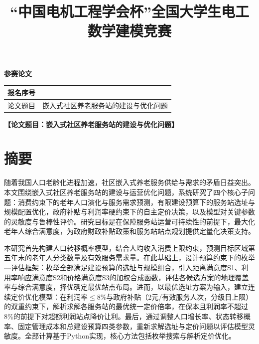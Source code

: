 \documentclass[UTF8]{ctexart}
\title{“中国电机工程学会杯”全国大学生电工数学建模竞赛}
\begin{document}
\date{}
\maketitle
\thispagestyle{fancy}

\begin{center}
    {\Huge \textbf{参\hspace{0.2em}赛\hspace{0.2em}论\hspace{0.2em}文}}
\end{center}

\vspace{1cm}

\begin{table}[h]
\centering
\renewcommand{\arraystretch}{2.3}
\begin{tabular}{|>{\centering\arraybackslash}m{2.5cm}|>{\centering\arraybackslash}m{10cm}|}
\hline
报名序号 & 005698 \\
\hline
论文题目 & 嵌入式社区养老服务站的建设与优化问题 \\
\hline
\end{tabular}
\end{table}

\newpage
\newpage

\begin{center}
    {\large \textbf{【论文题目：嵌入式社区养老服务站的建设与优化问题】}}
\end{center}

\vspace{0.5cm}

\section*{摘\hspace{1em}要}

随着我国人口老龄化进程加速，社区嵌入式养老服务供给与需求的矛盾日益突出。本文围绕嵌入式社区养老服务站的建设与运营优化问题，系统研究了四个核心子问题：消费约束下的老年人口演化与服务需求预测，有限建设预算下的服务站选址与规模配置优化，政府补贴与利润率硬约束下的自主定价决策，以及模型对关键参数的灵敏度与鲁棒性评价。研究目标是在保障服务站运营可持续性的前提下，最大化老年人综合满意度，为政府财政补贴政策和服务站站点规划提供定量化决策支持。

\vspace{0.2cm}

本研究首先构建人口转移概率模型，结合人均收入消费上限约束，预测目标区域第五年末的老年人分类数量及有效服务需求量。在此基础上，设计预算约束下的枚举—评估框架：枚举全部满足建设预算的选址与规模组合，引入距离满意度S1、利用率响应满意度S2和价格满意度S3的加权合成函数，评估各候选方案的地理覆盖率与综合满意度，择优确定最优站点布局。进而，以最优选址方案为输入，建立连续定价优化模型：在利润率$\leq 8\%$与政府补贴（2元/有效服务人次，分级日上限）的双重约束下，解析求解各服务站的最优统一定价倍率，在保本且利润率不超过8\%的前提下对超额利润站点降价让利。最后，通过调整人口增长率、状态转移概率、固定管理成本和总建设预算四类参数，重新求解选址与定价问题以评估模型灵敏度。全部计算基于Python实现，核心方法包括枚举搜索与解析定价优化。
\end{document}
